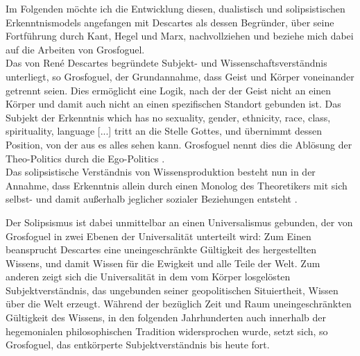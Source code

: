 Im Folgenden möchte ich die Entwicklung diesen, dualistisch und solipsistischen
Erkenntnismodels angefangen mit Descartes als dessen Begründer, über seine
Fortführung durch Kant, Hegel und Marx, nachvollziehen und beziehe mich dabei
auf die Arbeiten von Grosfoguel. 
\\

Das von René Descartes begründete Subjekt-
und Wissenschaftsverständnis unterliegt, so Grosfoguel, der Grundannahme, dass
Geist und Körper voneinander getrennt seien. Dies ermöglicht eine Logik, nach
der der Geist nicht an einen Körper und damit auch nicht an einen spezifischen
Standort gebunden ist. \footnotemark {}
Das Subjekt der Erkenntnis  \glqq [...]which has no
sexuality, gender, ethnicity, race, class, spirituality, language [...] \grqq
\footnotemark {} tritt an die Stelle
Gottes, und übernimmt dessen Position, von der aus es alles sehen kann.
Grosfoguel nennt dies die Ablösung der  \glqq Theo-Politics \grqq \footnotemark
{} durch die
\glqq Ego-Politics \grqq. \footnotemark {}\\
Das solipsistische Verständnis von Wissensproduktion besteht nun in der
Annahme, dass Erkenntnis allein durch einen Monolog des Theoretikers mit sich
selbst- und damit außerhalb jeglicher sozialer Beziehungen entsteht
\footnotemark {}.

Der Solipsismus ist dabei unmittelbar an einen Universalismus gebunden, der von
Grosfoguel in zwei Ebenen der Universalität unterteilt wird: Zum Einen
beansprucht Descartes eine uneingeschränkte Gültigkeit des hergestellten
Wissens, und damit Wissen für die Ewigkeit und alle Teile der Welt. Zum anderen
zeigt sich die Universalität in dem vom Körper losgelösten Subjektverständnis,
das ungebunden seiner geopolitischen Situiertheit, Wissen über die Welt
erzeugt. Während der bezüglich Zeit und Raum  uneingeschränkten Gültigkeit des
Wissens, in den folgenden Jahrhunderten auch innerhalb der hegemonialen
philosophischen Tradition widersprochen wurde, setzt sich, so Grosfoguel, das
entkörperte Subjektverständnis bis heute fort.
\\

